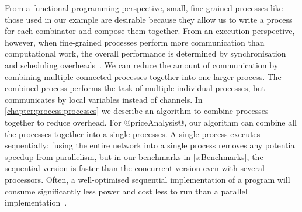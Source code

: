 
From a functional programming perspective, small, fine-grained processes like those used in our example are desirable because they allow us to write a process for each combinator and compose them together.
From an execution perspective, however, when fine-grained processes perform more communication than computational work, the overall performance is determined by synchronisation and scheduling overheads~\cite{chen1990impact}.
We can reduce the amount of communication by combining multiple connected processes together into one larger process.
The combined process performs the task of multiple individual processes, but communicates by local variables instead of channels.
In \cref{chapter:process:processes} we describe an algorithm to combine processes together to reduce overhead.
For @priceAnalysis@, our algorithm can combine all the processes together into a single processes.
A single process executes sequentially; fusing the entire network into a single process removes any potential speedup from parallelism, but in our benchmarks in \cref{s:Benchmarks}, the sequential version is faster than the concurrent version even with several processors.
Often, a well-optimised sequential implementation of a program will consume significantly less power and cost less to run than a parallel implementation~\cite{mcsherry2015scalability}.


